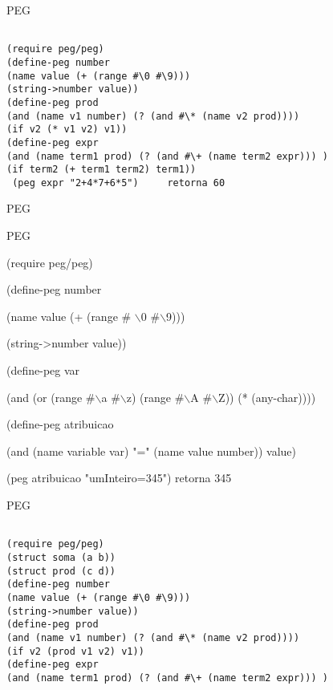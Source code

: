 \documentclass{beamer}
\begin{document}



\begin{frame}[fragile]{PEG}
\begin{verbatim}

(require peg/peg)
(define-peg number
(name value (+ (range #\0 #\9)))
(string->number value))
(define-peg prod
(and (name v1 number) (? (and #\* (name v2 prod))))
(if v2 (* v1 v2) v1))
(define-peg expr
(and (name term1 prod) (? (and #\+ (name term2 expr))) )
(if term2 (+ term1 term2) term1))
 (peg expr "2+4*7+6*5")     retorna 60
\end{verbatim}
\end{frame}



\begin{frame}[fragile]{PEG}

PEG

(require peg/peg)

(define-peg number

            (name value (+ (range \# $\backslash$0 \#$\backslash$9)))
            
            (string->number value))
            
(define-peg var

            (and (or (range \#$\backslash$a \#$\backslash$z) (range \#$\backslash$A \#$\backslash$Z)) (* (any-char))))
            

(define-peg atribuicao

            (and (name variable var) "=" (name value number)) value)
            
(peg atribuicao "umInteiro=345") retorna 345

\end{frame}



\begin{frame}[fragile]{PEG}
\begin{verbatim}

(require peg/peg)
(struct soma (a b))
(struct prod (c d))
(define-peg number
(name value (+ (range #\0 #\9)))
(string->number value))
(define-peg prod
(and (name v1 number) (? (and #\* (name v2 prod))))
(if v2 (prod v1 v2) v1))
(define-peg expr
(and (name term1 prod) (? (and #\+ (name term2 expr))) )

\end{verbatim}
\end{frame}
\end{document}
